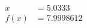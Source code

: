 \documentclass[preview]{standalone}
\begin{document}
\begin{align*}
x &= 5.0333\\f(x) &= 7.9998612
\end{align*}
\end{document}
